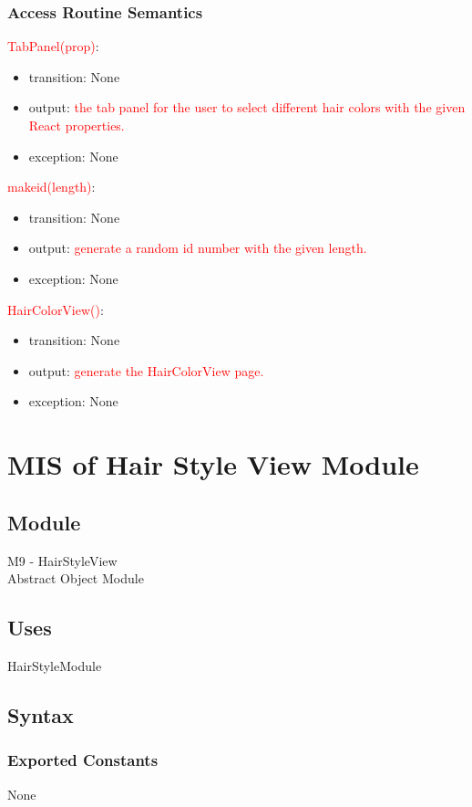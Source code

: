 \documentclass[12pt, titlepage]{article}
\begin{document}
\subsubsection{Access Routine Semantics}

\noindent \textcolor{red}{TabPanel(prop)}:
\begin{itemize}
\item transition: None 
\item output: \textcolor{red}{the tab panel for the user to select different hair colors with the given React properties.}
\item exception: None
\end{itemize}

\noindent \textcolor{red}{makeid(length)}:
\begin{itemize}
\item transition: None 
\item output: \textcolor{red}{generate a random id number with the given length.}
\item exception: None
\end{itemize}

\noindent \textcolor{red}{HairColorView()}:
\begin{itemize}
\item transition: None 
\item output: \textcolor{red}{generate the HairColorView page.}
\item exception: None
\end{itemize}

\newpage


\section{MIS of Hair Style View Module} \label{Module} 
\subsection{Module}
M9 - HairStyleView\\
Abstract Object Module

\subsection{Uses}
HairStyleModule 

\subsection{Syntax}
\subsubsection{Exported Constants}
None
\end{document}
